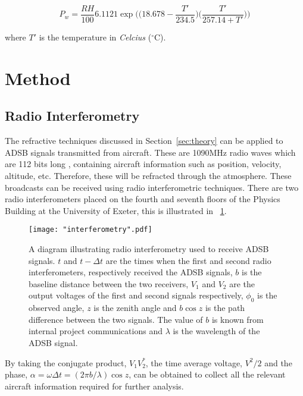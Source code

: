 \documentclass[11pt]{article}
\newcommand{\figref}[2][\figurename~]{#1\ref{#2}}
\newcommand{\secref}[2][Section~]{#1\ref{#2}}
\begin{document}
\begin{equation}
P_w = \frac{RH}{100} 6.1121 \exp \bigg( \bigg(18.678 - \frac{T'}{234.5} \bigg) \bigg (\frac{T'}{257.14 + T'} \bigg) \bigg)
\label{eq:Arden-Buck}
\end{equation}

\vspace{2mm}
\noindent
where $T'$ is the temperature in \textit{Celcius} ($^{\circ}$C).

\section{Method}
\label{sec:method}

\subsection{Radio Interferometry}
\label{ssec:radio-interferometry}

The refractive techniques discussed in \secref{sec:theory} can be applied to ADSB signals transmitted from aircraft. These are 1090MHz radio waves which are 112 bits long \cite{Book02}, containing aircraft information such as position, velocity, altitude, etc. Therefore, these will be refracted through the atmosphere. These broadcasts can be received using radio interferometric techniques. There are two radio interferometers placed on the fourth and seventh floors of the Physics Building at the University of Exeter, this is illustrated in \figref{fig:interferometry}.

\begin{figure}[h]
\centering
\texttt{[image: "interferometry".pdf]}
\caption{A diagram illustrating radio interferometry used to receive ADSB signals. $t$ and $t - \Delta t$ are the times when the first and second radio interferometers, respectively received the ADSB signals, $b$ is the baseline distance between the two receivers, $V_1$ and $V_2$ are the output voltages of the first and second signals respectively, $\phi_0$ is the observed angle, $z$ is the zenith angle and $b \cos z$ is the path difference between the two signals. The value of $b$ is known from internal project communications and $\lambda$ is the wavelength of the ADSB signal.}
\label{fig:interferometry}
\end{figure}

\newpage
\vspace{2mm}
\noindent
By taking the conjugate product, $V_1 V_2^*$, the time average voltage, $V^2/2$ and the phase, $\alpha = \omega \Delta t = (2 \pi b / \lambda) \cos z$, can be obtained to collect all the relevant aircraft information required for further analysis.
\end{document}
